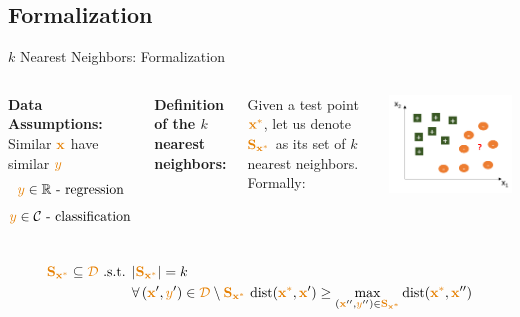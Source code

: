 \documentclass[aspectratio=169,10pt]{beamer}
\begin{document}
\subsection{Formalization}
\begin{frame}{$k$ Nearest Neighbors: Formalization}
		\begin{columns}
		\textbf{Data Assumptions:}\\
		Similar $\boldx$ have similar $\smally$
		\pause
		\begin{equation*}
			\smally \in \mathbb{R} \text{ - regression}
		\end{equation*}
	\vspace{-0.6cm}
		\begin{equation*}
			\smally \in \mathcal{C} \text{ - classification}
		\end{equation*}
	
	\vspace{0.4cm}
	\pause
		\textbf{Definition of the $k$ nearest neighbors:}
		
		Given a test point $\unseenx$, let us denote $\knnset_\unseenx$ as its set of $k$ nearest neighbors. Formally: 
		
		\begin{center}
			\onslide
			\includegraphics[width=\linewidth, clip]{images/example_hypothesis}
		\end{center}
	\end{columns}
\pause
\begin{align*}
	{\knnset_\unseenx} \subseteq \trainset \text{ .s.t. } &  |\knnset_\unseenx| = k  \\
	& \forall \, (\boldx', \smally') \in \trainset \setminus \knnset_\unseenx \,\, \text{dist}(\unseenx,\boldx') \geq \max_{(\boldx'', \smally'') \in \knnset_\unseenx} \text{dist}(\unseenx,\boldx'')
\end{align*}
	

\end{frame}
\end{document}
